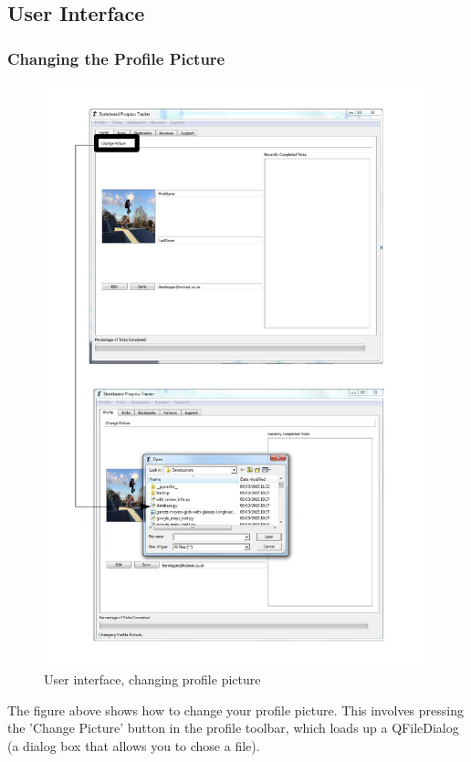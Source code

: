 \subsection{User Interface}

\subsubsection{Changing the Profile Picture}

\begin{figure}[H]
    \includegraphics[width=\textwidth]{./Maintenance/Figures/ChangePicture.pdf}
    \caption{User interface, changing profile picture} \label{fig:Changing Picture UI}
\end{figure}

The figure above shows how to change your profile picture. This involves pressing the 'Change Picture' button in the profile toolbar, which loads up a QFileDialog (a dialog box that allows you to chose a file).



